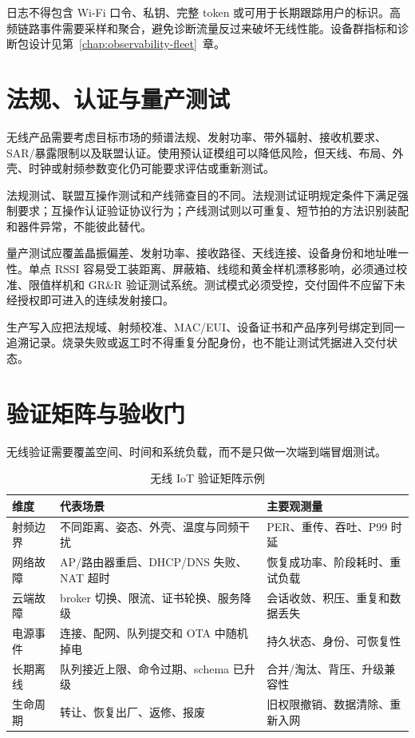 日志不得包含 Wi-Fi 口令、私钥、完整 token 或可用于长期跟踪用户的标识。高频链路事件需要采样和聚合，避免诊断流量反过来破坏无线性能。设备群指标和诊断包设计见\mbox{第~\ref{chap:observability-fleet}~章}。

\section{法规、认证与量产测试}

无线产品需要考虑目标市场的频谱法规、发射功率、带外辐射、接收机要求、SAR/暴露限制以及联盟认证。使用预认证模组可以降低风险，但天线、布局、外壳、时钟或射频参数变化仍可能要求评估或重新测试。

法规测试、联盟互操作测试和产线筛查目的不同。法规测试证明规定条件下满足强制要求；互操作认证验证协议行为；产线测试则以可重复、短节拍的方法识别装配和器件异常，不能彼此替代。

量产测试应覆盖晶振偏差、发射功率、接收路径、天线连接、设备身份和地址唯一性。单点 RSSI 容易受工装距离、屏蔽箱、线缆和黄金样机漂移影响，必须通过校准、限值样机和 GR\&R 验证测试系统。测试模式必须受控，交付固件不应留下未经授权即可进入的连续发射接口。

生产写入应把法规域、射频校准、MAC/EUI、设备证书和产品序列号绑定到同一追溯记录。烧录失败或返工时不得重复分配身份，也不能让测试凭据进入交付状态。

\section{验证矩阵与验收门}

无线验证需要覆盖空间、时间和系统负载，而不是只做一次端到端冒烟测试。

\begin{table}[htbp]
  \centering
  \caption{无线 IoT 验证矩阵示例}
  \small
  \begin{tabular}{p{27mm}p{48mm}p{55mm}}
    \hline
    维度 & 代表场景 & 主要观测量 \\
    \hline
    射频边界 & 不同距离、姿态、外壳、温度与同频干扰 & PER、重传、吞吐、P99 时延 \\
    网络故障 & AP/路由器重启、DHCP/DNS 失败、NAT 超时 & 恢复成功率、阶段耗时、重试负载 \\
    云端故障 & broker 切换、限流、证书轮换、服务降级 & 会话收敛、积压、重复和数据丢失 \\
    电源事件 & 连接、配网、队列提交和 OTA 中随机掉电 & 持久状态、身份、可恢复性 \\
    长期离线 & 队列接近上限、命令过期、schema 已升级 & 合并/淘汰、背压、升级兼容性 \\
    生命周期 & 转让、恢复出厂、返修、报废 & 旧权限撤销、数据清除、重新入网 \\
    \hline
  \end{tabular}
\end{table}

